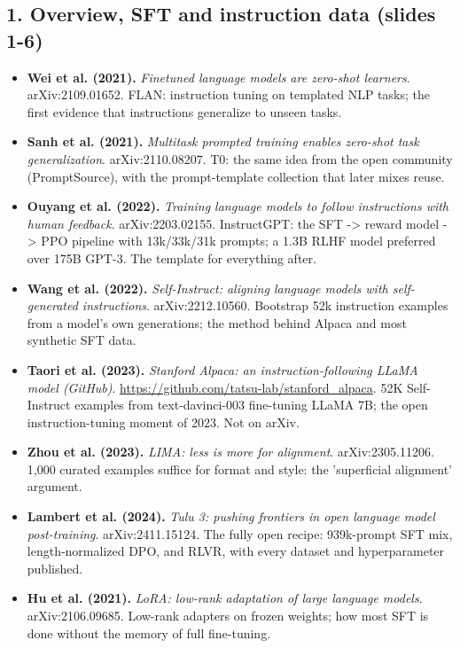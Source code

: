 \documentclass[11pt,letterpaper]{article}
\begin{document}
\subsection*{1. Overview, SFT and instruction data (slides 1-6)}
\begin{itemize}[leftmargin=1.2em,itemsep=3pt]\sloppy
\item \textbf{Wei et al. (2021).} \textit{Finetuned language models are zero-shot learners}. arXiv:2109.01652. FLAN: instruction tuning on templated NLP tasks; the first evidence that instructions generalize to unseen tasks.
\item \textbf{Sanh et al. (2021).} \textit{Multitask prompted training enables zero-shot task generalization}. arXiv:2110.08207. T0: the same idea from the open community (PromptSource), with the prompt-template collection that later mixes reuse.
\item \textbf{Ouyang et al. (2022).} \textit{Training language models to follow instructions with human feedback}. arXiv:2203.02155. InstructGPT: the SFT -> reward model -> PPO pipeline with 13k/33k/31k prompts; a 1.3B RLHF model preferred over 175B GPT-3. The template for everything after.
\item \textbf{Wang et al. (2022).} \textit{Self-Instruct: aligning language models with self-generated instructions}. arXiv:2212.10560. Bootstrap 52k instruction examples from a model's own generations; the method behind Alpaca and most synthetic SFT data.
\item \textbf{Taori et al. (2023).} \textit{Stanford Alpaca: an instruction-following LLaMA model (GitHub)}. \url{https://github.com/tatsu-lab/stanford_alpaca}. 52K Self-Instruct examples from text-davinci-003 fine-tuning LLaMA 7B; the open instruction-tuning moment of 2023. Not on arXiv.
\item \textbf{Zhou et al. (2023).} \textit{LIMA: less is more for alignment}. arXiv:2305.11206. 1,000 curated examples suffice for format and style: the 'superficial alignment' argument.
\item \textbf{Lambert et al. (2024).} \textit{Tulu 3: pushing frontiers in open language model post-training}. arXiv:2411.15124. The fully open recipe: 939k-prompt SFT mix, length-normalized DPO, and RLVR, with every dataset and hyperparameter published.
\item \textbf{Hu et al. (2021).} \textit{LoRA: low-rank adaptation of large language models}. arXiv:2106.09685. Low-rank adapters on frozen weights; how most SFT is done without the memory of full fine-tuning.

\end{itemize}
\end{document}
